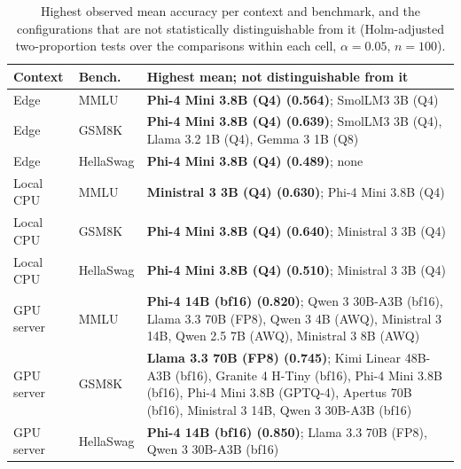 \begin{table}[!t]
\revstart\centering
\caption{Highest observed mean accuracy per context and benchmark, and the configurations that are not statistically distinguishable from it (Holm-adjusted two-proportion tests over the comparisons within each cell, $\alpha=0.05$, $n=100$).}
\label{tab:leaders}
\footnotesize
\setlength{\tabcolsep}{3pt}
\begin{tabularx}{\columnwidth}{@{}l l L@{}}
\toprule
\textbf{Context} & \textbf{Bench.} & \textbf{Highest mean; not distinguishable from it} \\
\midrule
Edge & MMLU & \textbf{Phi-4 Mini 3.8B (Q4) (0.564)}; SmolLM3 3B (Q4) \\
Edge & GSM8K & \textbf{Phi-4 Mini 3.8B (Q4) (0.639)}; SmolLM3 3B (Q4), Llama 3.2 1B (Q4), Gemma 3 1B (Q8) \\
Edge & HellaSwag & \textbf{Phi-4 Mini 3.8B (Q4) (0.489)}; none \\
\midrule
Local CPU & MMLU & \textbf{Ministral 3 3B (Q4) (0.630)}; Phi-4 Mini 3.8B (Q4) \\
Local CPU & GSM8K & \textbf{Phi-4 Mini 3.8B (Q4) (0.640)}; Ministral 3 3B (Q4) \\
Local CPU & HellaSwag & \textbf{Phi-4 Mini 3.8B (Q4) (0.510)}; Ministral 3 3B (Q4) \\
\midrule
GPU server & MMLU & \textbf{Phi-4 14B (bf16) (0.820)}; Qwen 3 30B-A3B (bf16), Llama 3.3 70B (FP8), Qwen 3 4B (AWQ), Ministral 3 14B, Qwen 2.5 7B (AWQ), Ministral 3 8B (AWQ) \\
GPU server & GSM8K & \textbf{Llama 3.3 70B (FP8) (0.745)}; Kimi Linear 48B-A3B (bf16), Granite 4 H-Tiny (bf16), Phi-4 Mini 3.8B (bf16), Phi-4 Mini 3.8B (GPTQ-4), Apertus 70B (bf16), Ministral 3 14B, Qwen 3 30B-A3B (bf16) \\
GPU server & HellaSwag & \textbf{Phi-4 14B (bf16) (0.850)}; Llama 3.3 70B (FP8), Qwen 3 30B-A3B (bf16) \\
\bottomrule
\end{tabularx}
\end{table}
